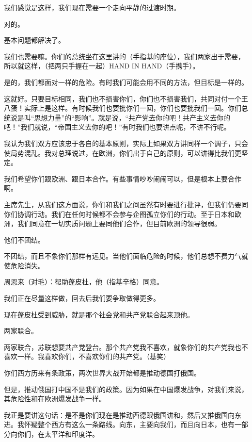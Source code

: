 我们感觉是这样，我们现在需要一个走向平静的过渡时期。

对的。

基本问题都解决了。

我们也需要嘛。你们的总统坐在这里讲的（手指基的座位），我们两家出于需要，所以就这样，（把两只手握在一起）HAND IN HAND（手携手）。

是的，我们都面对一样的危险。有时我们可能会用不同的方法，但目标是一样的。

这就好。只要目标相同，我们也不损害你们，你们也不损害我们，共同对付一个王八蛋！实际上是这样。有时候我们也要批你们一回，你们也要批我们一回。你们总统说是叫“思想力量”的“影响”。就是说，“共产党去你的吧！共产主义去你的吧！”我们就说，“帝国主义去你的吧！”有时我们也要讲点呢，不讲不行呢。

我认为我们双方应该忠于各自的基本原则，实际上如果双方讲同样一个调子，只会使局势混乱。我对总理说过，在欧洲，你们出于自己的原则，可以讲得比我们更坚定。

我们希望你们跟欧洲、跟日本合作。有些事情吵吵闹闹可以，但是根本上要合作啊。

主席先生，从我们这方面说，你们和我们之间虽然有时要进行批评，但我们仍要同你们协调行动。我们在任何时候都不会参与企图孤立你们的行动。至于日本和欧洲，我们同意在一切实质问题上要同他们合作，但目前欧洲的领导很弱。

他们不团结。

不团结，而且不象你们那样有远见。当他们面临危险的时候，他们总想不费力气就使危险消失。

周恩来（对毛）：帮助蓬皮杜，他（指基辛格）同意。

我们正在尽量这样做，回去后我们要争取做得更多。

现在蓬皮杜受到威胁，就是那个社会党和共产党联合起来顶他。

两家联合。

两家联合，苏联想要共产党登台。那个共产党我不喜欢，就象你们的共产党我也不喜欢一样。我喜欢你们，不喜欢你们的共产党。（基笑）

你们西方历来有条政策，两次世界大战开始都是推动德国打俄国。

但是，推动俄国打中国不是我们的政策。因为如果在中国爆发战争，对我们来说，其危险性和在欧洲爆发战争一样。

我正是要讲这句话：是不是你们现在是推动西德跟俄国讲和，然后又推俄国向东进。我怀疑整个西方有这么一条路线。向东，主要向我们，而且向日本，也有一部分向你们，在太平洋和印度洋。

